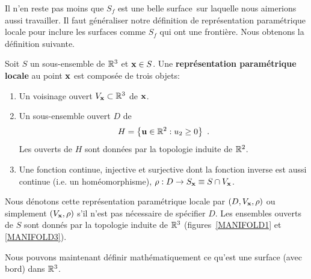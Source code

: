 {

Il n'en reste pas moins que $S_f$ est une \flqq belle surface\frqq\
sur laquelle nous aimerions aussi travailler.  Il faut généraliser notre
définition de représentation paramétrique locale pour inclure les
surfaces comme $S_f$ qui ont une frontière.  Nous obtenons la définition
suivante.

\begin{focus}{\dfn} 
Soit $S$ un sous-ensemble de $\mathbb{R}^3$ et $\mathbf{x} \in S$.  Une
{\bfseries représentation paramétrique locale} au point $\mathbf{x}$ est
composée de trois objets:
\begin{enumerate}
\item Un voisinage ouvert $V_{\mathbf{x}} \subset \mathbb{R}^3$ de $\mathbf{x}$.
\item Un sous-ensemble ouvert $D$ de
\[
H = \left\{ \mathbf{u} \in \mathbb{R}^2 : u_2 \geq 0 \right\} \ .
\]
Les ouverts de $H$ sont données par la topologie induite de $\mathbb{R}^2$.
\item Une fonction continue, injective et surjective dont la fonction inverse
est aussi continue (i.e. un homéomorphisme),
$\rho:D\rightarrow S_{\mathbf{x}} \equiv S \cap V_{\mathbf{x}}$.
\end{enumerate}
Nous dénotons cette représentation paramétrique locale par
$(D,V_{\mathbf{x}},\rho)$ ou simplement $(V_{\mathbf{x}},\rho)$ s'il n'est
pas nécessaire de spécifier $D$.  Les ensembles ouverts de $S$ sont donnés par
la topologie induite de $\mathbb{R}^3$ (figures~\ref{MANIFOLD1} et
\ref{MANIFOLD3}).
\end{focus}


Nous pouvons maintenant définir mathématiquement ce qu'est une surface
(avec bord) dans $\mathbb{R}^3$.

}
